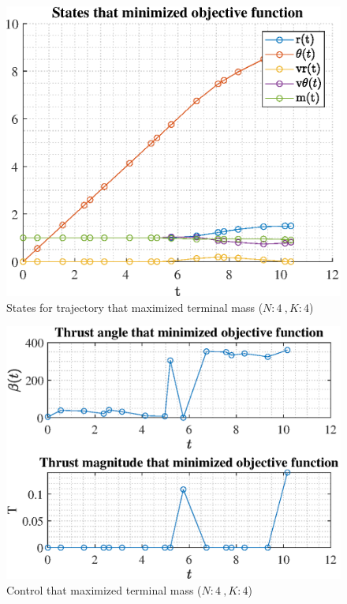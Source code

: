 \documentclass[]{article}
\begin{document}
\begin{figure}
	\centering
	\includegraphics[scale=0.75]{states_N4_K4_C2_mf.eps}
	\caption{States for trajectory that maximized terminal mass (\(N:4\ , K:4\))}
	\label{fig:states_N4_K4_C2_mf}
\end{figure}
\begin{figure}
	\centering
	\includegraphics[scale=0.75]{control_N4_K4_C2_mf.eps}
	\caption{Control that maximized terminal mass (\(N:4\ , K:4\))}
	\label{fig:control_N4_K4_C2_mf}
\end{figure}
\end{document}
